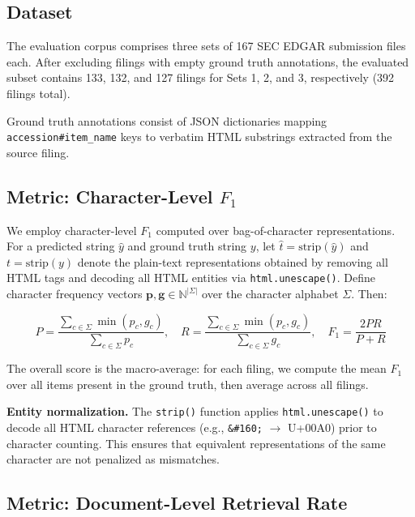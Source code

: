 \documentclass[12pt,letterpaper,oneside]{article}
\begin{document}
\subsection{Dataset}

The evaluation corpus comprises three sets of 167 SEC EDGAR
submission files each. After excluding filings with empty ground
truth annotations, the evaluated subset contains 133, 132, and 127
filings for Sets 1, 2, and 3, respectively (392 filings total).

Ground truth annotations consist of JSON dictionaries mapping
\texttt{accession\#item\_name} keys to verbatim HTML substrings
extracted from the source filing.

\subsection{Metric: Character-Level $F_1$}

We employ character-level $F_1$ computed over bag-of-character
representations. For a predicted string $\hat{y}$ and ground truth
string $y$, let $\hat{t} = \text{strip}(\hat{y})$ and
$t = \text{strip}(y)$ denote the plain-text representations obtained
by removing all HTML tags and decoding all HTML entities via
\texttt{html.unescape()}. Define character frequency vectors
$\bm{p}, \bm{g} \in \mathbb{N}^{|\Sigma|}$ over the character
alphabet $\Sigma$. Then:

\begin{equation}\label{eq:f1}
P = \frac{\sum_{c \in \Sigma} \min(p_c, g_c)}{\sum_{c \in \Sigma} p_c}, \quad
R = \frac{\sum_{c \in \Sigma} \min(p_c, g_c)}{\sum_{c \in \Sigma} g_c}, \quad
F_1 = \frac{2PR}{P + R}
\end{equation}

The overall score is the macro-average: for each filing, we compute
the mean $F_1$ over all items present in the ground truth, then
average across all filings.

\noindent\textbf{Entity normalization.} The \texttt{strip()} function
applies \texttt{html.unescape()} to decode all HTML character
references (e.g., \texttt{\&\#160;} $\to$ U+00A0) prior to
character counting. This ensures that equivalent representations
of the same character are not penalized as mismatches.

\subsection{Metric: Document-Level Retrieval Rate}
\end{document}
